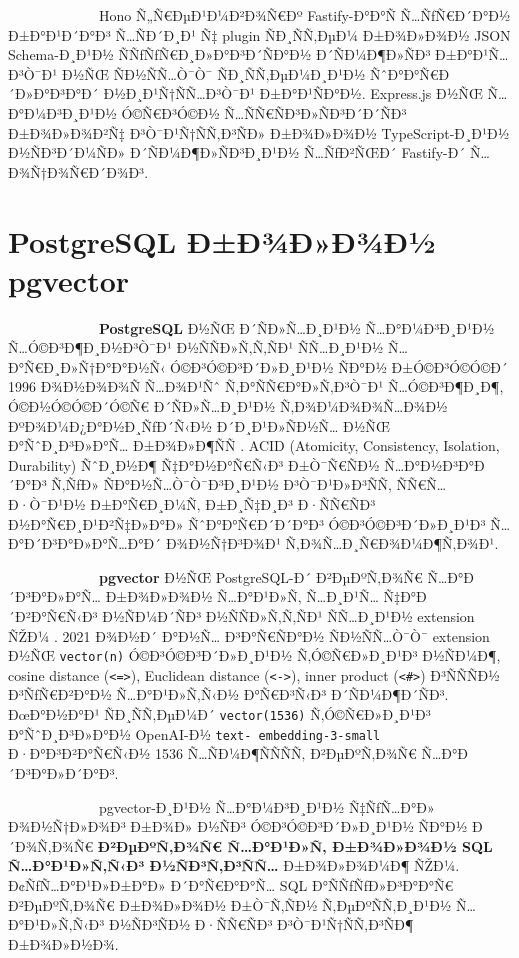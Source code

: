 \documentclass[12pt,A4]{report}
\begin{document}
\ \ \ \ \ \ \ \ \  \ \ \ \ Hono Ñ„Ñ€ÐµÐ¹Ð¼Ð²Ð¾Ñ€Ðº Fastify-Ð°Ð°Ñ Ñ…ÑƒÑ€Ð´Ð°Ð½ Ð±Ð°Ð¹Ð´Ð°Ð³
Ñ…ÑÐ´Ð¸Ð¹ Ñ‡ plugin ÑÐ¸ÑÑ‚ÐµÐ¼ Ð±Ð¾Ð»Ð¾Ð½ JSON Schema-Ð¸Ð¹Ð½ ÑÑƒÑƒÑ€Ð¸Ð»Ð°Ð³Ð´ÑÐ°Ð½ Ð´ÑÐ¼Ð¶Ð»ÑÐ³
Ð±Ð°Ð¹Ñ…Ð³Ò¯Ð¹ Ð½ÑŒ ÑÐ½ÑÑ…Ò¯Ò¯ ÑÐ¸ÑÑ‚ÐµÐ¼Ð¸Ð¹Ð½ ÑˆÐ°Ð°Ñ€Ð´Ð»Ð°Ð³Ð°Ð´ Ð½Ð¸Ð¹Ñ†ÑÑ…Ð³Ò¯Ð¹ Ð±Ð°Ð¹ÑÐ°Ð½. Express.js
Ð½ÑŒ Ñ…Ð°Ð¼Ð³Ð¸Ð¹Ð½ Ó©Ñ€Ð³Ó©Ð½ Ñ…ÑÑ€ÑÐ³Ð»ÑÐ³Ð´Ð´ÑÐ³ Ð±Ð¾Ð»Ð¾Ð²Ñ‡ Ð³Ò¯Ð¹Ñ†ÑÑ‚Ð³ÑÐ» Ð±Ð¾Ð»Ð¾Ð½ TypeScript-Ð¸Ð¹Ð½
Ð½ÑÐ³Ð´Ð¼ÑÐ» Ð´ÑÐ¼Ð¶Ð»ÑÐ³Ð¸Ð¹Ð½ Ñ…ÑƒÐ²ÑŒÐ´ Fastify-Ð´ Ñ…Ð¾Ñ†Ð¾Ñ€Ð´Ð¾Ð³.

\section{PostgreSQL Ð±Ð¾Ð»Ð¾Ð½ pgvector}

\ \ \ \ \ \ \ \ \  \ \ \ \ \textbf{PostgreSQL} Ð½ÑŒ Ð´ÑÐ»Ñ…Ð¸Ð¹Ð½ Ñ…Ð°Ð¼Ð³Ð¸Ð¹Ð½
Ñ…Ó©Ð³Ð¶Ð¸Ð½Ð³Ò¯Ð¹ Ð½ÑÑÐ»Ñ‚Ñ‚ÑÐ¹ ÑÑ…Ð¸Ð¹Ð½ Ñ…Ð°Ñ€Ð¸Ð»Ñ†Ð°Ð°Ð½Ñ‹ Ó©Ð³Ó©Ð³Ð´Ð»Ð¸Ð¹Ð½ ÑÐ°Ð½ Ð±Ó©Ð³Ó©Ó©Ð´ 1996 Ð¾Ð½Ð¾Ð¾Ñ
Ñ…Ð¾Ð¹Ñˆ Ñ‚Ð°ÑÑ€Ð°Ð»Ñ‚Ð³Ò¯Ð¹ Ñ…Ó©Ð³Ð¶Ð¸Ð¶, Ó©Ð½Ó©Ó©Ð´Ó©Ñ€ Ð´ÑÐ»Ñ…Ð¸Ð¹Ð½ Ñ‚Ð¾Ð¼Ð¾Ð¾Ñ…Ð¾Ð½ ÐºÐ¾Ð¼Ð¿Ð°Ð½Ð¸ÑƒÐ´Ñ‹Ð½ Ð´Ð¸Ð¹Ð»ÑÐ½Ñ…
Ð½ÑŒ Ð°ÑˆÐ¸Ð³Ð»Ð°Ñ… Ð±Ð¾Ð»Ð¶ÑÑ \cite{postgresql2024}. ACID (Atomicity, Consistency,
Isolation, Durability) ÑˆÐ¸Ð½Ð¶ Ñ‡Ð°Ð½Ð°Ñ€Ñ‹Ð³ Ð±Ò¯Ñ€ÑÐ½ Ñ…Ð°Ð½Ð³Ð°Ð´Ð°Ð³ Ñ‚ÑƒÐ» ÑÐ°Ð½Ñ…Ò¯Ò¯Ð³Ð¸Ð¹Ð½
Ð³Ò¯Ð¹Ð»Ð³ÑÑ, ÑÑ€Ñ… Ð·Ò¯Ð¹Ð½ Ð±Ð°Ñ€Ð¸Ð¼Ñ‚ Ð±Ð¸Ñ‡Ð¸Ð³ Ð·ÑÑ€ÑÐ³ Ð½Ð°Ñ€Ð¸Ð¹Ð²Ñ‡Ð»Ð°Ð» ÑˆÐ°Ð°Ñ€Ð´Ð´Ð°Ð³
Ó©Ð³Ó©Ð³Ð´Ð»Ð¸Ð¹Ð³ Ñ…Ð°Ð´Ð³Ð°Ð»Ð°Ñ…Ð°Ð´ Ð¾Ð½Ñ†Ð³Ð¾Ð¹ Ñ‚Ð¾Ñ…Ð¸Ñ€Ð¾Ð¼Ð¶Ñ‚Ð¾Ð¹.

\ \ \ \ \ \ \ \ \  \ \ \ \ \textbf{pgvector} Ð½ÑŒ PostgreSQL-Ð´ Ð²ÐµÐºÑ‚Ð¾Ñ€
Ñ…Ð°Ð´Ð³Ð°Ð»Ð°Ñ… Ð±Ð¾Ð»Ð¾Ð½ Ñ…Ð°Ð¹Ð»Ñ‚ Ñ…Ð¸Ð¹Ñ… Ñ‡Ð°Ð´Ð²Ð°Ñ€Ñ‹Ð³ Ð½ÑÐ¼Ð´ÑÐ³ Ð½ÑÑÐ»Ñ‚Ñ‚ÑÐ¹ ÑÑ…Ð¸Ð¹Ð½ extension
ÑŽÐ¼ \cite{pgvector2024}. 2021 Ð¾Ð½Ð´ Ð°Ð½Ñ… Ð³Ð°Ñ€ÑÐ°Ð½ ÑÐ½ÑÑ…Ò¯Ò¯ extension Ð½ÑŒ
\texttt{vector(n)} Ó©Ð³Ó©Ð³Ð´Ð»Ð¸Ð¹Ð½ Ñ‚Ó©Ñ€Ð»Ð¸Ð¹Ð³ Ð½ÑÐ¼Ð¶, cosine distance
(\texttt{<=>}), Euclidean distance (\texttt{<->}), inner product
(\texttt{<\#>}) Ð³ÑÑÑÐ½ Ð³ÑƒÑ€Ð²Ð°Ð½ Ñ…Ð°Ð¹Ð»Ñ‚Ñ‹Ð½ Ð°Ñ€Ð³Ñ‹Ð³ Ð´ÑÐ¼Ð¶Ð´ÑÐ³. ÐœÐ°Ð½Ð°Ð¹ ÑÐ¸ÑÑ‚ÐµÐ¼Ð´
\texttt{vector(1536)} Ñ‚Ó©Ñ€Ð»Ð¸Ð¹Ð³ Ð°ÑˆÐ¸Ð³Ð»Ð°Ð½ OpenAI-Ð½
\texttt{text- embedding-3-small} Ð·Ð°Ð³Ð²Ð°Ñ€Ñ‹Ð½ 1536 Ñ…ÑÐ¼Ð¶ÑÑÑÑ‚ Ð²ÐµÐºÑ‚Ð¾Ñ€
Ñ…Ð°Ð´Ð³Ð°Ð»Ð´Ð°Ð³.

\ \ \ \ \ \ \ \ \  \ \ \ \ pgvector-Ð¸Ð¹Ð½ Ñ…Ð°Ð¼Ð³Ð¸Ð¹Ð½ Ñ‡ÑƒÑ…Ð°Ð» Ð¾Ð½Ñ†Ð»Ð¾Ð³ Ð±Ð¾Ð» Ð½ÑÐ³
Ó©Ð³Ó©Ð³Ð´Ð»Ð¸Ð¹Ð½ ÑÐ°Ð½ Ð´Ð¾Ñ‚Ð¾Ñ€ \textbf{Ð²ÐµÐºÑ‚Ð¾Ñ€ Ñ…Ð°Ð¹Ð»Ñ‚ Ð±Ð¾Ð»Ð¾Ð½ SQL Ñ…Ð°Ð¹Ð»Ñ‚Ñ‹Ð³
Ð½ÑÐ³Ñ‚Ð³ÑÑ…} Ð±Ð¾Ð»Ð¾Ð¼Ð¶ ÑŽÐ¼. Ð¢ÑƒÑ…Ð°Ð¹Ð»Ð±Ð°Ð» Ð´Ð°Ñ€Ð°Ð°Ñ… SQL Ð°ÑÑƒÑƒÐ»Ð³Ð°Ð°Ñ€ Ð²ÐµÐºÑ‚Ð¾Ñ€
Ð±Ð¾Ð»Ð¾Ð½ Ð±Ò¯Ñ‚ÑÐ½ Ñ‚ÐµÐºÑÑ‚Ð¸Ð¹Ð½ Ñ…Ð°Ð¹Ð»Ñ‚Ñ‹Ð³ Ð½ÑÐ³ÑÐ½ Ð·ÑÑ€ÑÐ³ Ð³Ò¯Ð¹Ñ†ÑÑ‚Ð³ÑÐ¶ Ð±Ð¾Ð»Ð½Ð¾.
\end{document}
